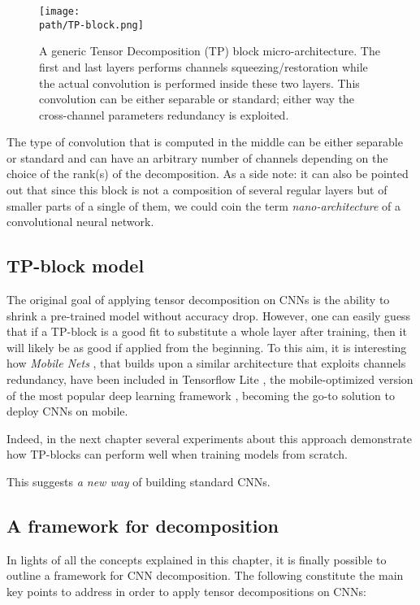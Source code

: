 \begin{figure}[h!]
 \centering
 \texttt{[image: \\path/TP-block.png]} 
 \caption{A generic Tensor Decomposition (TP) block micro-architecture. The first and last layers performs channels squeezing/restoration while the actual convolution is performed inside these two layers. This convolution can be either separable or standard; either way the cross-channel parameters redundancy is exploited. }
 \label{fig:TP-block}
\end{figure}

\pagebreak
The type of convolution that is computed in the middle can be either separable or standard and can have an arbitrary number of channels depending on the choice of the rank(s) of the decomposition. 
\newline 
As a side note: it can also be pointed out that since this block is not a composition of several regular layers but of smaller parts of a single of them, we could coin the term \emph{nano-architecture} of a convolutional neural network. 

\subsection{TP-block model}
The original goal of applying tensor decomposition on CNNs is the ability to shrink a pre-trained model without accuracy drop. However, one can easily guess that if a TP-block is a good fit to substitute a whole layer after training, then it will likely be as good if applied from the beginning. 
\newline
To this aim, it is interesting how \emph{Mobile Nets} \parencite{mobilenets}, that builds upon a similar architecture that exploits channels redundancy, have been included in Tensorflow Lite \parencite{WTFlite}, the mobile-optimized version of the most popular deep learning framework \parencite{tensorflow}, becoming the go-to solution to deploy CNNs on mobile. 

Indeed, in the next chapter several experiments about this approach demonstrate how TP-blocks can perform well when training models from scratch. 
\newline 

This suggests \emph{a new way} of building standard CNNs.  


\subsection{A framework for decomposition}
\label{subsec:framework}
In lights of all the concepts explained in this chapter, it is finally possible to outline a framework for CNN decomposition. The following constitute the main key points to address in order to apply tensor decompositions on CNNs: 

